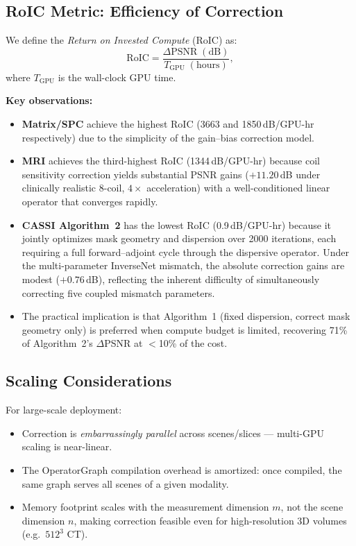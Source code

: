 \documentclass[11pt]{article}
\theoremstyle{definition}
\begin{document}
\subsection{RoIC Metric: Efficiency of Correction}

We define the \emph{Return on Invested Compute} (RoIC) as:
\begin{equation}
  \mathrm{RoIC}
  = \frac{\Delta\mathrm{PSNR}\;(\text{dB})}
         {T_{\mathrm{GPU}}\;(\text{hours})},
\end{equation}
where $T_{\mathrm{GPU}}$ is the wall-clock GPU time.

\noindent\textbf{Key observations:}
\begin{itemize}
  \item \textbf{Matrix/SPC} achieve the highest RoIC (3663 and 1850\,dB/GPU-hr
        respectively) due to the simplicity of the gain--bias correction model.
  \item \textbf{MRI} achieves the third-highest RoIC (1344\,dB/GPU-hr) because coil
        sensitivity correction yields substantial PSNR gains ($+11.20$\,dB under
        clinically realistic 8-coil, $4\times$ acceleration) with a well-conditioned
        linear operator that converges rapidly.
  \item \textbf{CASSI Algorithm~2} has the lowest RoIC (0.9\,dB/GPU-hr)
        because it jointly optimizes mask geometry and dispersion over 2000
        iterations, each requiring a full forward--adjoint cycle through the
        dispersive operator. Under the multi-parameter InverseNet mismatch,
        the absolute correction gains are modest ($+0.76$\,dB), reflecting
        the inherent difficulty of simultaneously correcting five coupled
        mismatch parameters.
  \item The practical implication is that Algorithm~1 (fixed dispersion,
        correct mask geometry only) is preferred when compute budget is
        limited, recovering 71\% of Algorithm~2's $\Delta$PSNR at
        $<$10\% of the cost.
\end{itemize}

\subsection{Scaling Considerations}

For large-scale deployment:
\begin{itemize}
  \item Correction is \emph{embarrassingly parallel} across scenes/slices ---
        multi-GPU scaling is near-linear.
  \item The OperatorGraph compilation overhead is amortized: once compiled,
        the same graph serves all scenes of a given modality.
  \item Memory footprint scales with the measurement dimension $m$, not the
        scene dimension $n$, making correction feasible even for
        high-resolution 3D volumes (e.g.\ $512^3$ CT).
\end{itemize}
\end{document}
